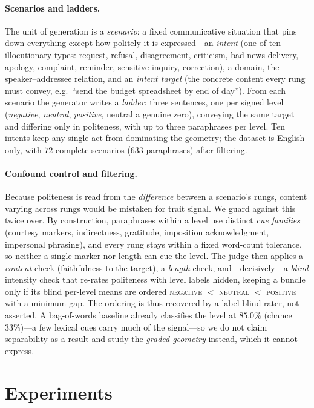 \documentclass{article}
\begin{document}
\paragraph{Scenarios and ladders.} The unit of generation is a \emph{scenario}: a fixed communicative situation that
pins down everything except how politely it is expressed---an \emph{intent} (one
of ten illocutionary types: request, refusal, disagreement, criticism, bad-news
delivery, apology, complaint, reminder, sensitive inquiry, correction), a domain,
the speaker--addressee relation, and an \emph{intent target} (the concrete content
every rung must convey, e.g.\ ``send the budget spreadsheet by end of
day''). From each scenario the generator writes a \emph{ladder}: three sentences,
one per signed level (\emph{negative}, \emph{neutral}, \emph{positive}, neutral a
genuine zero), conveying the same target and differing only in politeness, with up
to three paraphrases per level. Ten intents keep any single act from dominating the geometry; the dataset is English-only, with $72$ complete scenarios ($633$ paraphrases) after filtering. 

\paragraph{Confound control and filtering.}
Because politeness is read from the \emph{difference} between a scenario's rungs,
content varying across rungs would be mistaken for trait signal. We guard against
this twice over. By construction, paraphrases within a level use distinct
\emph{cue families} (courtesy markers, indirectness, gratitude, imposition
acknowledgment, impersonal phrasing), and every rung stays within a fixed
word-count tolerance, so neither a single marker nor length can cue the level. The
judge then applies a \emph{content} check (faithfulness to the target), a
\emph{length} check, and---decisively---a \emph{blind} intensity check that
re-rates politeness with level labels hidden, keeping a bundle only if its blind
per-level means are ordered \textsc{negative} $<$ \textsc{neutral} $<$
\textsc{positive} with a minimum gap. The ordering is thus recovered by a
label-blind rater, not asserted. A bag-of-words baseline already classifies the
level at $85.0\%$ (chance $33\%$)---a few lexical cues carry much of the
signal---so we do not claim separability as a result and study the \emph{graded
geometry} instead, which it cannot express.

\section{Experiments}\label{sec:experiments}
\end{document}
